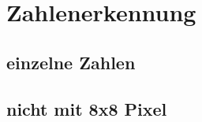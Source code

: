 \section{Zahlenerkennung} \label{sec:digit_rec}

\subsection{einzelne Zahlen}

\subsection{nicht mit 8x8 Pixel}
